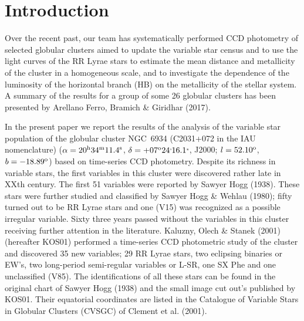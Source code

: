 \documentclass[journal]{rmaa}
\newcommand{\1}{\'{\i}}
\begin{document}

\maketitle

\section{Introduction}
\label{sec:intro}

Over the recent past, our team has systematically performed CCD photometry of
selected globular clusters aimed to
update the variable star census and to use the light curves of the RR  Lyrae stars to
 estimate the mean distance and metallicity of the cluster in a
homogeneous scale,
and to investigate the dependence of the luminosity of the horizontal branch (HB) on
the metallicity of the stellar system. A summary of the results for a group of some
26 globular clusters has been presented by Arellano Ferro, Bramich \& Giridhar
(2017).

In the present paper we report the results of the analysis of the variable star
population of the globular cluster NGC~6934
(C2031+072 in the IAU nomenclature) ($\alpha = 20^{\mbox{\scriptsize h}}
34^{\mbox{\scriptsize m}} 11.4^{\mbox{\scriptsize s}}$, $\delta =
+07^{\mbox{\scriptsize o}} 24{\mbox{\scriptsize '}} 16.1{\mbox{\scriptsize "}}$,
J2000; $l = 52.10^{\mbox{\scriptsize o}}$, $b = -18.89^{\mbox{\scriptsize o}}$) based
on time-series CCD photometry.
Despite its richness in variable stars, the first variables in this
cluster were discovered rather
late in XXth century. The first 51 variables were reported by Sawyer Hogg (1938).
These stars were further studied and classified by Sawyer Hogg \& Wehlau (1980); fifty
turned out to be RR Lyrae stars and one (V15) was recognized as a
possible irregular variable. Sixty three years passed without the variables in this
cluster
receiving further attention in the literature. Kaluzny, Olech \&  Stanek (2001)
(hereafter KOS01)
performed a time-series CCD photometric study of the cluster and discovered 35 new
variables; 29 RR Lyrae stars, two eclipsing binaries or EW's, two long-period
semi-regular variables or L-SR,
one SX Phe and one unclassified (V85). The identifications of all
these stars can be found in the original chart of Sawyer Hogg (1938) and the small
image cut out's published by KOS01. Their equatorial coordinates are
listed in the Catalogue of Variable Stars in Globular Clusters (CVSGC) of Clement et
al. (2001).
\end{document}
